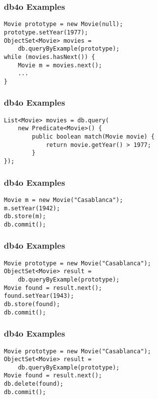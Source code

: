\documentclass[dvipsnames]{beamer}
\theoremstyle{plain}
\begin{document}
\begin{frame}[fragile]
  \frametitle{db4o Examples}

  \begin{example}
    \begin{lstlisting}
Movie prototype = new Movie(null);
prototype.setYear(1977);
ObjectSet<Movie> movies =
    db.queryByExample(prototype);
while (movies.hasNext()) {
    Movie m = movies.next();
    ...
}
    \end{lstlisting}
  \end{example}
\end{frame}

\begin{frame}[fragile]
  \frametitle{db4o Examples}

  \begin{example}
    \begin{lstlisting}
List<Movie> movies = db.query(
    new Predicate<Movie>() {
        public boolean match(Movie movie) {
            return movie.getYear() > 1977;
        }
});
    \end{lstlisting}
  \end{example}
\end{frame}

\begin{frame}[fragile]
  \frametitle{db4o Examples}

  \begin{example}[insert]
    \begin{lstlisting}
Movie m = new Movie("Casablanca");
m.setYear(1942);
db.store(m);
db.commit();
    \end{lstlisting}
  \end{example}
\end{frame}

\begin{frame}[fragile]
  \frametitle{db4o Examples}

  \begin{example}[update]
    \begin{lstlisting}
Movie prototype = new Movie("Casablanca");
ObjectSet<Movie> result =
    db.queryByExample(prototype);
Movie found = result.next();
found.setYear(1943);
db.store(found);
db.commit();
    \end{lstlisting}
  \end{example}
\end{frame}

\begin{frame}[fragile]
  \frametitle{db4o Examples}

  \begin{example}[delete]
    \begin{lstlisting}
Movie prototype = new Movie("Casablanca");
ObjectSet<Movie> result =
    db.queryByExample(prototype);
Movie found = result.next();
db.delete(found);
db.commit();
    \end{lstlisting}
  \end{example}
\end{frame}
\end{document}
